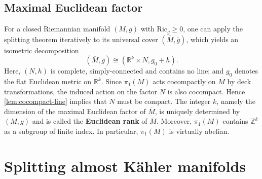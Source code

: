 \documentclass[11pt,twoside]{amsart}
\newcommand{\Z}{\mathbb{Z}}
\newcommand{\R}{\mathbb{R}}
\begin{document}
\subsection{Maximal Euclidean factor}
For a closed Riemannian manifold $(M,g)$ with $\text{Ric}_g\geq 0$, one can apply the splitting theorem iteratively to its universal
cover $(\overline M,\overline g)$, which yields an isometric decomposition
\[
    (\overline M,\overline g)
    \cong
    (\mathbb{R}^k\times N,g_{0}+h).
\]
Here,  $(N,h)$ is complete, simply-connected and contains no line; and $g_0$ denotes the flat Euclidean metric on $\R^k$. Since
$\pi_1(M)$ acts cocompactly on $\overline M$ by deck transformations, the
induced action on the factor $N$ is also cocompact. Hence
\autoref{lem:cocompact-line} implies that $N$ must be compact. The integer
$k$, namely the dimension of the maximal Euclidean factor of $\overline M$,
is uniquely determined by $(M,g)$ and is called the {\bf Euclidean rank} of $\overline M$. Moreover, $\pi_1(M)$ contains $\Z^k$ as a subgroup of finite index. In particular, $\pi_1(M)$ is virtually abelian.



\section{Splitting almost K\"ahler manifolds}\label{section:AKsplitting}



\end{document}
